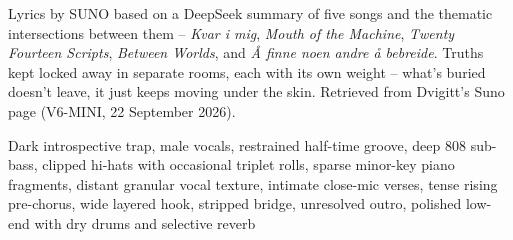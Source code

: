 
\label{sec:five-rooms-one-key}
\begin{notes}
Lyrics by SUNO based on a DeepSeek summary of five songs and the thematic intersections between them -- \emph{Kvar i mig}, \emph{Mouth of the Machine}, \emph{Twenty Fourteen Scripts}, \emph{Between Worlds}, and \emph{Å finne noen andre å bebreide}. Truths kept locked away in separate rooms, each with its own weight -- what's buried doesn't leave, it just keeps moving under the skin. Retrieved from Dvigitt's Suno page (V6-MINI, 22 September 2026).
\end{notes}
\begin{style}
Dark introspective trap, male vocals, restrained half-time groove, deep 808 sub-bass, clipped hi-hats with occasional triplet rolls, sparse minor-key piano fragments, distant granular vocal texture, intimate close-mic verses, tense rising pre-chorus, wide layered hook, stripped bridge, unresolved outro, polished low-end with dry drums and selective reverb
\end{style}
